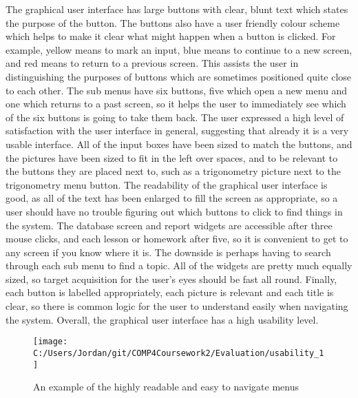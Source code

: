 The graphical user interface has large buttons with clear, blunt text which states the purpose of the button. The buttons also have a user friendly colour scheme which helps to make it clear what might happen when a button is clicked. For example, yellow means to mark an input, blue means to continue to a new screen, and red means to return to a previous screen. This assists the user in distinguishing the purposes of buttons which are sometimes positioned quite close to each other. The sub menus have six buttons, five which open a new menu and one which returns to a past screen, so it helps the user to immediately see which of the six buttons is going to take them back. The user expressed a high level of satisfaction with the user interface in general, suggesting that already it is a very usable interface. All of the input boxes have been sized to match the buttons, and the pictures have been sized to fit in the left over spaces, and to be relevant to the buttons they are placed next to, such as a trigonometry picture next to the trigonometry menu button. The readability of the graphical user interface is good, as all of the text has been enlarged to fill the screen as appropriate, so a user should have no trouble figuring out which buttons to click to find things in the system. The database screen and report widgets are accessible after three mouse clicks, and each lesson or homework after five, so it is convenient to get to any screen if you know where it is. The downside is perhaps having to search through each sub menu to find a topic. All of the widgets are pretty much equally sized, so target acquisition for the user's eyes should be fast all round. Finally, each button is labelled appropriately, each picture is relevant and each title is clear, so there is common logic for the user to understand easily when navigating the system. Overall, the graphical user interface has a high usability level.

\begin{figure}[H]
	\texttt{[image: C:/Users/Jordan/git/COMP4Coursework2/Evaluation/usability\_1]}
	\caption{An example of the highly readable and easy to navigate menus}
\end{figure}

